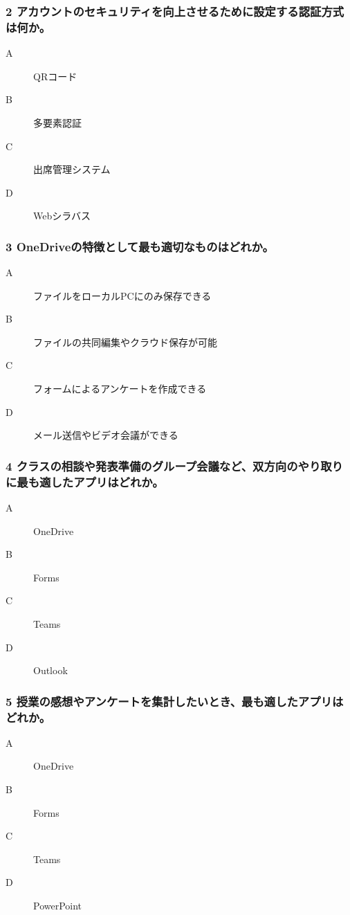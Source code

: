 \documentclass[a4paper,6pt]{jsarticle}
\begin{document}
\subsubsection*{2 アカウントのセキュリティを向上させるために設定する認証方式は何か。}
\begin{description}
  \item[A] QRコード
  \item[B] 多要素認証
  \item[C] 出席管理システム
  \item[D] Webシラバス
\end{description}

\subsubsection*{3 OneDriveの特徴として最も適切なものはどれか。}
\begin{description}
  \item[A] ファイルをローカルPCにのみ保存できる
  \item[B] ファイルの共同編集やクラウド保存が可能
  \item[C] フォームによるアンケートを作成できる
  \item[D] メール送信やビデオ会議ができる
\end{description}

\subsubsection*{4 クラスの相談や発表準備のグループ会議など、双方向のやり取りに最も適したアプリはどれか。}
\begin{description}
  \item[A] OneDrive
  \item[B] Forms 
  \item[C] Teams  
  \item[D] Outlook
\end{description}

\subsubsection*{5 授業の感想やアンケートを集計したいとき、最も適したアプリはどれか。}
\begin{description}
  \item[A] OneDrive
  \item[B] Forms
  \item[C] Teams
  \item[D] PowerPoint
\end{description}
\end{document}
